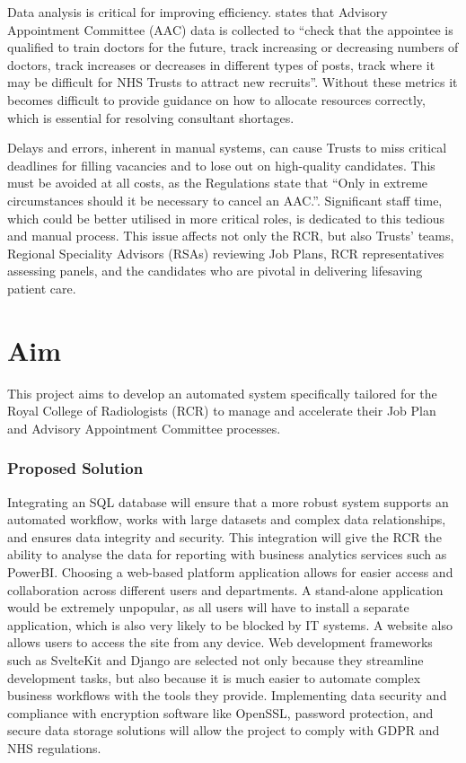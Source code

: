 Data analysis is critical for improving efficiency. \textcite{the_royal_college_of_radiologists_advisory_2024-1} states that Advisory Appointment Committee (AAC) data is collected to “check that the appointee is qualified to train doctors for the future, track increasing or decreasing numbers of doctors, track increases or decreases in different types of posts, track where it may be difficult for NHS Trusts to attract new recruits”. Without these metrics it becomes difficult to provide guidance on how to allocate resources correctly, which is essential for resolving consultant shortages.

Delays and errors, inherent in manual systems, can cause Trusts to miss critical deadlines for filling vacancies and to lose out on high-quality candidates. This must be avoided at all costs, as the \textcite{national_health_service_appointment_of_consultants_national_2005} Regulations state that “Only in extreme circumstances should it be necessary to cancel an AAC.”. Significant staff time, which could be better utilised in more critical roles, is dedicated to this tedious and manual process. This issue affects not only the RCR, but also Trusts’ teams, Regional Speciality Advisors (RSAs) reviewing Job Plans, RCR representatives assessing panels, and the candidates who are pivotal in delivering lifesaving patient care.
\section{Aim} \label{Aim}
This project aims to develop an automated system specifically tailored for the Royal College of Radiologists (RCR) to manage and accelerate their Job Plan and Advisory Appointment Committee processes. 

\subsubsection{Proposed Solution}
Integrating an SQL database will ensure that a more robust system supports an automated workflow, works with large datasets and complex data relationships, and ensures data integrity and security. This integration will give the RCR the ability to analyse the data for reporting with business analytics services such as PowerBI. Choosing a web-based platform application allows for easier access and collaboration across different users and departments. A stand-alone application would be extremely unpopular, as all users will have to install a separate application, which is also very likely to be blocked by IT systems. A website also allows users to access the site from any device. Web development frameworks such as SvelteKit and Django are selected not only because they streamline development tasks, but also because it is much easier to automate complex business workflows with the tools they provide. Implementing data security and compliance with encryption software like OpenSSL, password protection, and secure data storage solutions will allow the project to comply with GDPR and NHS regulations. 

